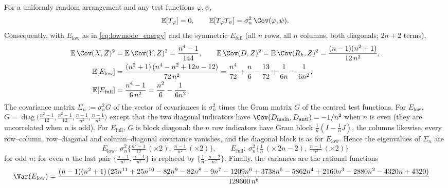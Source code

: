 \begin{proposition}
\label{prop:random_energy_moments}
For a uniformly random arrangement and any test functions $\varphi,\psi$,
\begin{equation}
\mathbb{E}[T_\varphi]=0,\qquad
\mathbb{E}[T_\varphi T_\psi] = \sigma_n^2\,\Cov(\varphi,\psi).
\label{eq:cov_T}
\end{equation}
Consequently, with $E_{\mathrm{low}}$ as in \eqref{eq:lowmode_energy} and the symmetric
$E_{\mathrm{full}}$ (all $n$ rows, all $n$ columns, both diagonals; $2n+2$ terms),
\begin{align}
\mathbb{E}\,\Cov(X,Z)^2 &= \mathbb{E}\,\Cov(Y,Z)^2 = \frac{n^4-1}{144},\qquad
\mathbb{E}\,\Cov(D,Z)^2 = \mathbb{E}\,\Cov(R_k,Z)^2 = \frac{(n-1)(n^2+1)}{12\,n^2},
\label{eq:single_terms}\\
\mathbb{E}[E_{\mathrm{low}}] &= \frac{(n^2+1)\,(n^4-n^2+12n-12)}{72\,n^2}
= \frac{n^4}{72}+\frac{n}{6}-\frac{13}{72}+\frac{1}{6n}-\frac{1}{6n^2},
\label{eq:mean_low}\\
\mathbb{E}[E_{\mathrm{full}}] &= \frac{n^4-1}{6\,n^2} = \frac{n^2}{6}-\frac{1}{6n^2}.
\label{eq:mean_full}
\end{align}
The covariance matrix $\Sigma_n:=\sigma_n^2 G$ of the vector of covariances is $\sigma_n^2$ times
the Gram matrix $G$ of the centred test functions. For $E_{\mathrm{low}}$,
$G=\operatorname{diag}\!\big(\tfrac{n^2-1}{12},\tfrac{n^2-1}{12},\tfrac{n-1}{n^2},\tfrac{n-1}{n^2}\big)$
except that the two diagonal indicators have $\Cov(D_{\mathrm{main}},D_{\mathrm{anti}})=-1/n^2$ when
$n$ is even (they are uncorrelated when $n$ is odd). For $E_{\mathrm{full}}$, $G$ is block diagonal:
the $n$ row indicators have Gram block $\tfrac1n(I-\tfrac1n J)$, the columns likewise, every
row--column, row--diagonal and column--diagonal covariance vanishes, and the diagonal block is as for
$E_{\mathrm{low}}$. Hence the eigenvalues of $\Sigma_n$ are
\begin{equation}
E_{\mathrm{low}}:\ \sigma_n^2\Big\{\tfrac{n^2-1}{12}\,(\times 2),\ \tfrac{n-1}{n^2}\,(\times 2)\Big\},
\qquad
E_{\mathrm{full}}:\ \sigma_n^2\Big\{\tfrac1n\,(\times\,2n-2),\ \tfrac{n-1}{n^2}\,(\times 2)\Big\}
\label{eq:weights}
\end{equation}
for odd $n$; for even $n$ the last pair $\{\tfrac{n-1}{n^2},\tfrac{n-1}{n^2}\}$ is replaced by
$\{\tfrac1n,\tfrac{n-2}{n^2}\}$. Finally, the variances are the rational functions
\begin{align}
\Var(E_{\mathrm{low}}) &=
\frac{(n-1)(n^2+1)\,(25n^{11}+25n^{10}-82n^{9}-82n^{8}-9n^{7}-1209n^{6}+3738n^{5}-5862n^{4}+2160n^{3}-2880n^{2}-4320n+4320)}{129600\,n^{6}}

\end{align}
\end{proposition}
